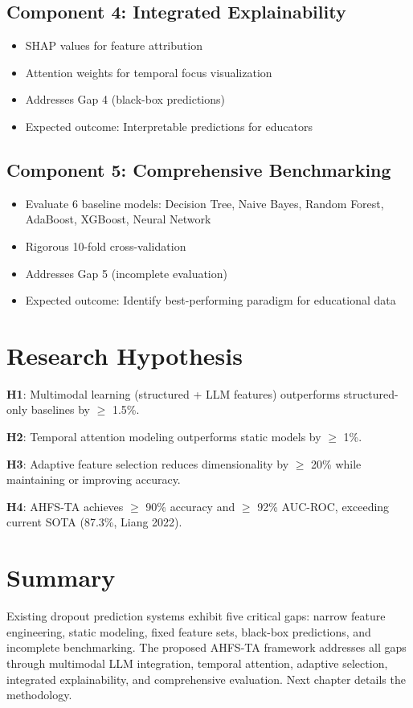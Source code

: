 \subsection{Component 4: Integrated Explainability}

\begin{itemize}
\item SHAP values for feature attribution
\item Attention weights for temporal focus visualization
\item Addresses Gap 4 (black-box predictions)
\item Expected outcome: Interpretable predictions for educators
\end{itemize}

\subsection{Component 5: Comprehensive Benchmarking}

\begin{itemize}
\item Evaluate 6 baseline models: Decision Tree, Naive Bayes, Random Forest, AdaBoost, XGBoost, Neural Network
\item Rigorous 10-fold cross-validation
\item Addresses Gap 5 (incomplete evaluation)
\item Expected outcome: Identify best-performing paradigm for educational data
\end{itemize}

\section{Research Hypothesis}

\textbf{H1}: Multimodal learning (structured + LLM features) outperforms structured-only baselines by $\geq$ 1.5\%.

\textbf{H2}: Temporal attention modeling outperforms static models by $\geq$ 1\%.

\textbf{H3}: Adaptive feature selection reduces dimensionality by $\geq$ 20\% while maintaining or improving accuracy.

\textbf{H4}: AHFS-TA achieves $\geq$ 90\% accuracy and $\geq$ 92\% AUC-ROC, exceeding current SOTA (87.3\%, Liang 2022).

\section{Summary}

Existing dropout prediction systems exhibit five critical gaps: narrow feature engineering, static modeling, fixed feature sets, black-box predictions, and incomplete benchmarking. The proposed AHFS-TA framework addresses all gaps through multimodal LLM integration, temporal attention, adaptive selection, integrated explainability, and comprehensive evaluation. Next chapter details the methodology.
